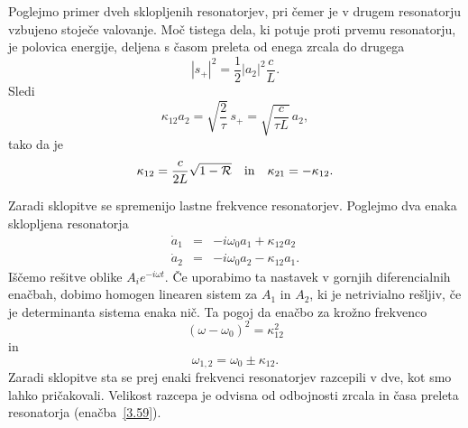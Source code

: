 Poglejmo primer dveh sklopljenih resonatorjev, pri čemer je v drugem resonatorju vzbujeno 
stoječe valovanje. Moč tistega dela, ki potuje proti prvemu resonatorju,
je polovica energije, deljena s časom preleta od enega zrcala do drugega
\begin{equation}
|s_{+}|^{2}=\frac{1}{2}|a_{2}|^{2}\frac{c}{L}.
\label{3.57}
\end{equation}
Sledi
\begin{equation}
\kappa_{12}a_{2}=\sqrt{\frac{2}{\tau}}\, s_{+}=\sqrt{\frac{c}{\tau L}}\, a_{2},
\label{3.58}
\end{equation}
 tako da je 
\begin{equation}
\kappa_{12}=\frac{c}{2L}\sqrt{1-{\cal R}}\quad \mathrm{in} \quad \kappa_{21}=-\kappa_{12}.
\label{3.59}
\end{equation}

Zaradi sklopitve se spremenijo lastne frekvence resonatorjev. 
Poglejmo dva enaka sklopljena resonatorja
\begin{eqnarray}
\dot{a}_{1} & = & -i\omega_{0}a_{1}+\kappa_{12}a_{2}\\
\dot{a}_{2} & = & -i\omega_{0}a_{2}-\kappa_{12}a_{1}.
\end{eqnarray}
 Iščemo rešitve oblike $A_{i}e^{-i\omega t}$. Če uporabimo ta nastavek v gornjih
diferencialnih enačbah, dobimo homogen linearen sistem za $A_{1}$ in
$A_{2}$, ki je netrivialno rešljiv, če je determinanta sistema enaka nič.
Ta pogoj da enačbo za krožno frekvenco 
\begin{equation}
(\omega-\omega_{0})^{2}=\kappa_{12}^{2}\label{3.61}
\end{equation}
 in 
\begin{equation}
\omega_{1,2}=\omega_{0}\pm\kappa_{12}.\label{3.62}
\end{equation}
Zaradi sklopitve sta se prej enaki frekvenci resonatorjev razcepili v dve, kot
smo lahko pričakovali. Velikost razcepa je odvisna od odbojnosti zrcala in časa
preleta resonatorja (enačba~\ref{3.59}).
